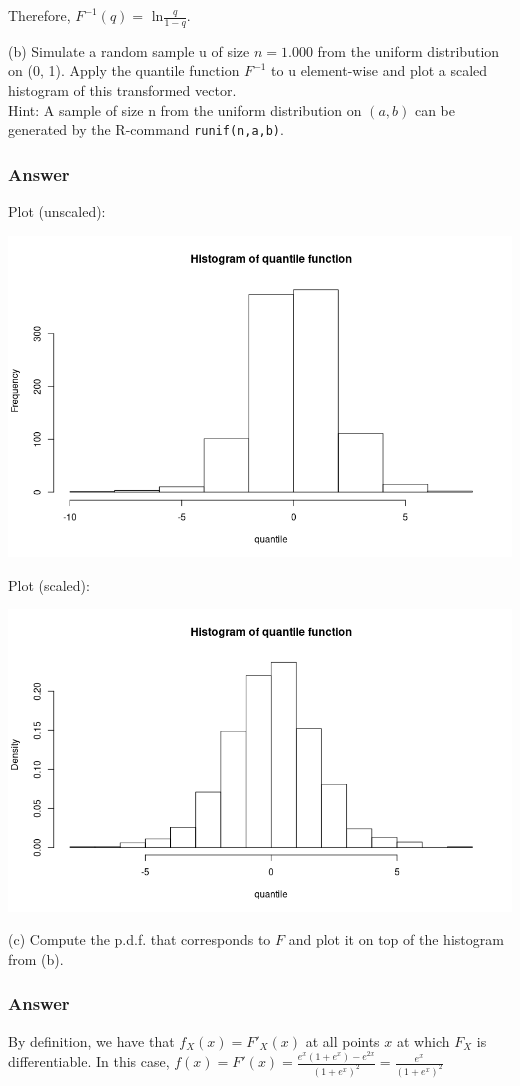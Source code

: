 \documentclass[12pt]{article}
\begin{document}
Therefore, $F^{-1}(q) =$ ln$\frac{q}{1-q}$.

(b) Simulate a random sample u of size $n = 1.000$ from the uniform distribution on (0, 1). Apply the quantile function $F^{-1}$ to u element-wise and plot a scaled histogram of this transformed vector.\\
Hint: A sample of size n from the uniform distribution on $(a, b)$ can be generated by the R-command \texttt{runif(n,a,b)}.
\subsubsection*{Answer}
Plot (unscaled): 

\includegraphics[width=\textwidth]{Ex4Plot1}

Plot (scaled):

\includegraphics[width=\textwidth]{Ex4Plot2scaled} 

(c) Compute the p.d.f. that corresponds to $F$ and plot it on top of the histogram from (b).
\subsubsection*{Answer}
By definition, we have that $f_{X}(x) = F'_{X}(x)$ at all points $x$ at which $F_{X}$ is differentiable. In this case, $f(x) = F'(x) = \frac{e^{x}(1+e^{x}) - e^{2x}}{(1+e^{x})^{2}} = \frac{e^{x}}{(1+e^{x})^{2}}$
\end{document}
